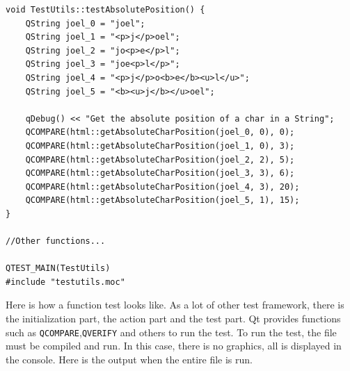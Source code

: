\begin{lstlisting}
void TestUtils::testAbsolutePosition() {
    QString joel_0 = "joel";
    QString joel_1 = "<p>j</p>oel";
    QString joel_2 = "jo<p>e</p>l";
    QString joel_3 = "joe<p>l</p>";
    QString joel_4 = "<p>j</p>o<b>e</b><u>l</u>";
    QString joel_5 = "<b><u>j</b></u>oel";

    qDebug() << "Get the absolute position of a char in a String";
    QCOMPARE(html::getAbsoluteCharPosition(joel_0, 0), 0);
    QCOMPARE(html::getAbsoluteCharPosition(joel_1, 0), 3);
    QCOMPARE(html::getAbsoluteCharPosition(joel_2, 2), 5);
    QCOMPARE(html::getAbsoluteCharPosition(joel_3, 3), 6);
    QCOMPARE(html::getAbsoluteCharPosition(joel_4, 3), 20);
    QCOMPARE(html::getAbsoluteCharPosition(joel_5, 1), 15);
}

//Other functions...

QTEST_MAIN(TestUtils)
#include "testutils.moc"
\end{lstlisting}
Here is how a function test looks like. As a lot of other test framework, there is the initialization part, the action part and the test part. Qt provides functions such as \texttt{QCOMPARE},\texttt{QVERIFY} and others to run the test. To run the test, the file must be compiled and run. In this case, there is no graphics, all is displayed in the console. Here is the output when the entire file is run.

